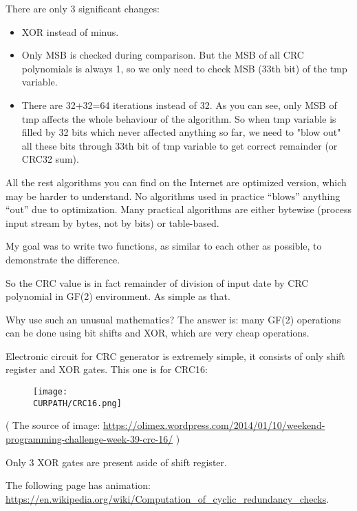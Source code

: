 There are only 3 significant changes:

\begin{itemize}
\item XOR instead of minus.

\item Only \ac{MSB} is checked during comparison. But the \ac{MSB} of all CRC polynomials is always 1,
so we only need to check \ac{MSB} (33th bit) of the tmp variable.

\item There are 32+32=64 iterations instead of 32.
As you can see, only \ac{MSB} of tmp affects the whole behaviour of the algorithm.
So when tmp variable is filled by 32 bits which never affected anything so far,
we need to "blow out" all these bits through 33th bit of tmp variable to get correct remainder (or CRC32 sum).
\end{itemize}

All the rest algorithms you can find on the Internet are optimized version, which may be harder to understand.
No algorithms used in practice ``blows'' anything ``out'' due to optimization.
Many practical algorithms are either bytewise (process input stream by bytes, not by bits) or table-based.

My goal was to write two functions, as similar to each other as possible, to demonstrate the difference.

So the CRC value is in fact remainder of division of input date by CRC polynomial in GF(2) environment.
As simple as that.


Why use such an unusual mathematics?
The answer is: many GF(2) operations can be done using bit shifts and XOR, which are very cheap operations.

Electronic circuit for CRC generator is extremely simple, it consists of only shift register and XOR gates.
This one is for CRC16:

\begin{figure}[H]
\centering
\texttt{[image: \\CURPATH/CRC16.png]}
\caption{}
\end{figure}

( The source of image: \url{https://olimex.wordpress.com/2014/01/10/weekend-programming-challenge-week-39-crc-16/} )

Only 3 XOR gates are present aside of shift register.

The following page has animation: \url{https://en.wikipedia.org/wiki/Computation_of_cyclic_redundancy_checks}.

